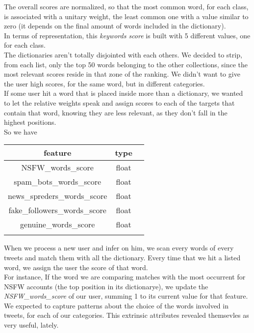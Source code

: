 \normalsize
The overall scores are normalized, so that the most common word, for each class, is associated with a unitary weight, the least common one with a value similar to zero (it depends on the final amount of words included in the dictionary).\\
In terms of representation, this \textit{keywords score} is built with 5 different values, one for each class.\\
The dictionaries aren't totally disjointed with each others.
We decided to strip, from each list, only the top 50 words belonging to the other collections, since the most relevant scores reside in that zone of the ranking. We didn't want to give the user high scores, for the same word, but in different categories.\\
If some user hit a word that is placed inside more than a dictionary, we wanted to let the relative weights speak and assign scores to each of the targets that contain that word, knowing they are less relevant, as they don't fall in the highest positions.\\
So we have

\small
\begin{center}
	\begin{tabular}{ccc}
		\\feature&type\\
		\hline\hline
		NSFW\_words\_score&float\\
		spam\_bots\_words\_score&float\\
		news\_spreders\_words\_score&float\\
		fake\_followers\_words\_score&float\\
		genuine\_words\_score&float\\\hline\\
	\end{tabular}
\end{center}
\normalsize
When we process a new user and infer on him, we scan every words of every tweets and match them with all the dictionary. Every time that we hit a listed word, we assign the user the score of that word.\\
For instance, If the word we are comparing matches with the most occurrent for NSFW accounts (the top position in its dictionarye), we update the \textit{NSFW\_words\_score} of our user, summing 1 to its current value for that feature.
We expected to capture patterns about the choice of the words involved in tweets, for each of our categories.
This extrinsic attributes revealed themsevles as very useful, lately.


